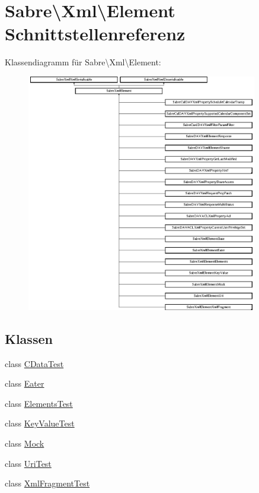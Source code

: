 \hypertarget{interface_sabre_1_1_xml_1_1_element}{}\section{Sabre\textbackslash{}Xml\textbackslash{}Element Schnittstellenreferenz}
\label{interface_sabre_1_1_xml_1_1_element}
Klassendiagramm für Sabre\textbackslash{}Xml\textbackslash{}Element\+:\begin{figure}[H]
\begin{center}
\leavevmode
\includegraphics[height=10.397878cm]{interface_sabre_1_1_xml_1_1_element}
\end{center}
\end{figure}
\subsection*{Klassen}
\begin{DoxyCompactItemize}
\item 
class \mbox{\hyperlink{class_sabre_1_1_xml_1_1_element_1_1_c_data_test}{C\+Data\+Test}}
\item 
class \mbox{\hyperlink{class_sabre_1_1_xml_1_1_element_1_1_eater}{Eater}}
\item 
class \mbox{\hyperlink{class_sabre_1_1_xml_1_1_element_1_1_elements_test}{Elements\+Test}}
\item 
class \mbox{\hyperlink{class_sabre_1_1_xml_1_1_element_1_1_key_value_test}{Key\+Value\+Test}}
\item 
class \mbox{\hyperlink{class_sabre_1_1_xml_1_1_element_1_1_mock}{Mock}}
\item 
class \mbox{\hyperlink{class_sabre_1_1_xml_1_1_element_1_1_uri_test}{Uri\+Test}}
\item 
class \mbox{\hyperlink{class_sabre_1_1_xml_1_1_element_1_1_xml_fragment_test}{Xml\+Fragment\+Test}}
\end{DoxyCompactItemize}
